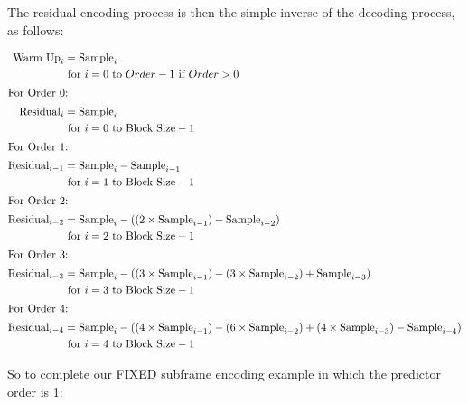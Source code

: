 \clearpage

The residual encoding process is then the simple inverse of the
decoding process, as follows:

\begin{align*}
\text{Warm Up}_i &= \text{Sample}_i \\
& \text{ for } i = 0 \text{ to } Order - 1 \text{ if } Order > 0\\
\intertext{For Order 0:}
\text{Residual}_i &= \text{Sample}_i \\
& \text{ for } i = 0 \text{ to Block Size} - 1 \\
\intertext{For Order 1:}
\text{Residual}_{i - 1} &= \text{Sample}_i - \text{Sample}_{i - 1} \\
& \text{ for } i = 1 \text{ to Block Size} - 1 \\
\intertext{For Order 2:}
\text{Residual}_{i - 2} &= \text{Sample}_i - ((2 \times \text{Sample}_{i - 1}) - \text{Sample}_{i - 2}) \\
& \text{ for } i = 2 \text{ to Block Size} - 1 \\
\intertext{For Order 3:}
\text{Residual}_{i - 3} &= \text{Sample}_i - ((3 \times \text{Sample}_{i - 1}) - (3 \times \text{Sample}_{i - 2}) + \text{Sample}_{i - 3}) \\
& \text{ for } i = 3 \text{ to Block Size} - 1 \\
\intertext{For Order 4:}
\text{Residual}_{i - 4} &= \text{Sample}_i - ((4 \times \text{Sample}_{i - 1}) - (6 \times \text{Sample}_{i - 2}) + (4 \times \text{Sample}_{i - 3}) - \text{Sample}_{i - 4}) \\
& \text{ for } i = 4 \text{ to Block Size} - 1 \\
\end{align*}

\clearpage

So to complete our FIXED subframe encoding example in which the
predictor order is 1:


